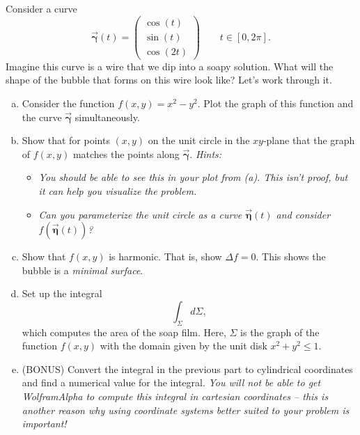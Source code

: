 \documentclass[12pt]{amsbook}
\newcommand{\curvegamma}{\boldsymbol{\vec{\gamma}}}
\begin{document}
\newpage
\begin{problem}
Consider a curve 
\[
\curvegamma(t) = \begin{pmatrix} \cos(t) \\ \sin(t) \\ \cos(2t) \end{pmatrix} \qquad t\in [0,2\pi].
\]
Imagine this curve is a wire that we dip into a soapy solution. What will the shape of the bubble that forms on this wire look like? Let's work through it.
        \vspace*{0.25cm}
    \begin{enumerate}[(a)]
        \item Consider the function $f(x,y)=x^2-y^2$. Plot the graph of this function and the curve $\curvegamma$ simultaneously.
        \vspace*{0.25cm}
        \item Show that for points $(x,y)$ on the unit circle in the $xy$-plane that the graph of $f(x,y)$ matches the points along $\curvegamma$. \emph{Hints:}
        \begin{itemize}
        \item \emph{You should be able to see this in your plot from (a). This isn't proof, but it can help you visualize the problem.}
        \item \emph{Can you parameterize the unit circle as a curve $\boldsymbol{\vec{\eta}}(t)$ and consider $f(\boldsymbol{\vec{\eta}}(t))$?}
        \end{itemize}
        \vspace*{0.25cm}
        \item Show that $f(x,y)$ is harmonic. That is, show $\Delta f = 0$. This shows the bubble is a \emph{minimal surface}.
        \vspace*{0.25cm}
        \item Set up the integral 
        \[
        \int_\Sigma d\Sigma,
        \]
        which computes the area of the soap film. Here, $\Sigma$ is the graph of the function $f(x,y)$ with the domain given by the unit disk $x^2+y^2\leq 1$.
        \vspace*{0.25cm}
        \item \textrm{(BONUS)} Convert the integral in the previous part to cylindrical coordinates and find a numerical value for the integral. \emph{You will not be able to get WolframAlpha to compute this integral in cartesian coordinates -- this is another reason why using coordinate systems better suited to your problem is important!}
    \end{enumerate}
\end{problem}
\end{document}
